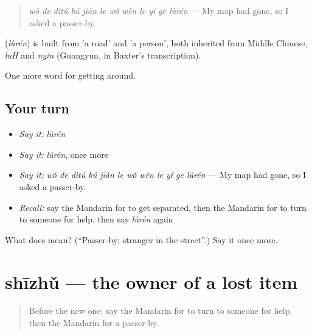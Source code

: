 \begin{quote}
\textbf{} \emph{wǒ de dìtú bú jiàn le wǒ wèn le yí ge lùrén} — My map had gone, so I asked a passer-by.
\end{quote}

\begin{cousinweb}
\textbf{} (\emph{lùrén}) is built from  'a road' and  'a person', both inherited from Middle Chinese, \emph{luH} and \emph{nyin} (Guangyun, in Baxter's transcription).
\end{cousinweb}

\begin{grammarlens}[title={What you've built}]
One more word for getting around.
\end{grammarlens}

\subsection*{Your turn}
\begin{itemize}
\raggedright
  \item \emph{Say it:} \emph{lùrén}
  \item \emph{Say it:} \emph{lùrén}, once more
  \item \emph{Say it:} \emph{wǒ de dìtú bú jiàn le wǒ wèn le yí ge lùrén} — My map had gone, so I asked a passer-by.
  \item \emph{Recall:} say the Mandarin for to get separated, then the Mandarin for to turn to someone for help, then say \emph{lùrén} again
\end{itemize}

\begin{tcolorbox}[breakable,colback=teal!4,colframe=teal!35!black,title={Before you move on}]
What does  mean? (\textquotedblleft{}Passer-by; stranger in the street\textquotedblright{}.) Say it once more.
\end{tcolorbox}
\section[shīzhǔ]{shīzhǔ — the owner of a lost item}

\label{lesson:ZH-C456-shizhu}



\begin{quote}
Before the new one: say the Mandarin for to turn to someone for help, then the Mandarin for a passer-by.
\end{quote}

